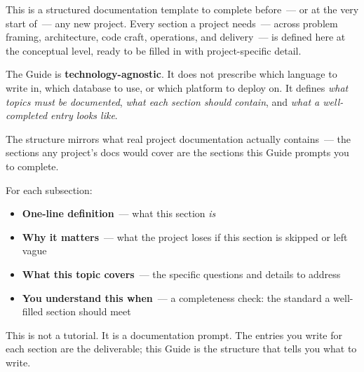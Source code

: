 \label{ch:project-planning-guide}


\chapterrule

\label{project-planning-guide:what-this-guide-is}

This is a structured documentation template to complete before~--- or at the very start of~--- any new project. Every section a project needs~--- across problem framing, architecture, code craft, operations, and delivery~--- is defined here at the conceptual level, ready to be filled in with project-specific detail.

The Guide is \textbf{technology-agnostic}. It does not prescribe which language to write in, which database to use, or which platform to deploy on. It defines \emph{what topics must be documented}, \emph{what each section should contain}, and \emph{what a well-completed entry looks like}.

The structure mirrors what real project documentation actually contains~--- the sections any project's docs would cover are the sections this Guide prompts you to complete.

\label{project-planning-guide:how-to-read-this-guide}

For each subsection:

\begin{itemize}
\tightlist
\item
  \textbf{One-line definition}~--- what this section \emph{is}
\item
  \textbf{Why it matters}~--- what the project loses if this section is skipped or left vague
\item
  \textbf{What this topic covers}~--- the specific questions and details to address
\item
  \textbf{You understand this when}~--- a completeness check: the standard a well-filled section should meet
\end{itemize}

\noindent{}This is not a tutorial. It is a documentation prompt. The entries you write for each section are the deliverable; this Guide is the structure that tells you what to write.

\label{project-planning-guide:section-1--problem-statement--goals}

